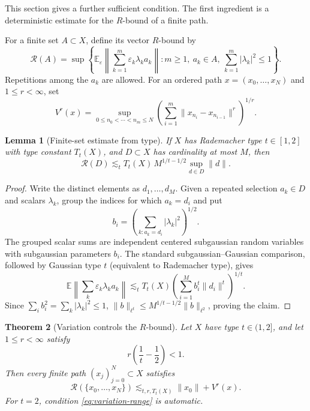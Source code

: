 \documentclass[11pt]{article}
\newtheorem{theorem}{Theorem}[section]
\newtheorem{lemma}[theorem]{Lemma}
\theoremstyle{definition}
\newcommand{\E}{\mathbb E}
\newcommand{\cR}{\mathcal R}
\newcommand{\1}{\mathbf 1}
\newcommand{\eps}{\varepsilon}
\begin{document}
This section gives a further sufficient condition.  The first ingredient is a
deterministic estimate for the $R$-bound of a finite path.

For a finite set $A\subset X$, define its vector $R$-bound by
\[
 \cR(A)=\sup\left\{
 \E_\eps\left\|\sum_{k=1}^m\eps_k\lambda_ka_k\right\|:
 m\ge1,\ a_k\in A,\ \sum_{k=1}^m|\lambda_k|^2\le1
 \right\}.
\]
Repetitions among the $a_k$ are allowed.  For an ordered path
$x=(x_0,\ldots,x_N)$ and $1\le r<\infty$, set
\[
 V^r(x)=\sup_{0\le n_0<\cdots<n_m\le N}
 \left(\sum_{i=1}^m\|x_{n_i}-x_{n_{i-1}}\|^r\right)^{1/r}.
\]

\begin{lemma}[Finite-set estimate from type]\label{lem:finite-set-type}
If $X$ has Rademacher type $t\in[1,2]$ with type constant $T_t(X)$, and
$D\subset X$ has cardinality at most $M$, then
\[
 \cR(D)\lesssim_t T_t(X)\,M^{1/t-1/2}\sup_{d\in D}\|d\|.
\]
\end{lemma}

\begin{proof}
Write the distinct elements as $d_1,\ldots,d_M$.  Given a repeated selection
$a_k\in D$ and scalars $\lambda_k$, group the indices for which $a_k=d_i$ and
put
\[
 b_i=\left(\sum_{k:a_k=d_i}|\lambda_k|^2\right)^{1/2}.
\]
The grouped scalar sums are independent centered subgaussian random variables
with subgaussian parameters $b_i$.  The standard subgaussian--Gaussian
comparison, followed by Gaussian type $t$ (equivalent to Rademacher type), gives
\[
 \E\left\|\sum_k\eps_k\lambda_ka_k\right\|
 \lesssim_t T_t(X)
 \left(\sum_{i=1}^M b_i^t\|d_i\|^t\right)^{1/t}.
\]
Since $\sum_i b_i^2=\sum_k|\lambda_k|^2\le1$,
$\|b\|_{\ell^t}\le M^{1/t-1/2}\|b\|_{\ell^2}$, proving the claim.
\end{proof}

\begin{theorem}[Variation controls the $R$-bound]\label{thm:variation-rbound}
Let $X$ have type $t\in(1,2]$, and let $1\le r<\infty$ satisfy
\begin{equation}\label{eq:variation-range}
 r\left(\frac1t-\frac12\right)<1.
\end{equation}
Then every finite path $(x_j)_{j=0}^N\subset X$ satisfies
\begin{equation}\label{eq:variation-rbound}
 \cR(\{x_0,\ldots,x_N\})
 \lesssim_{t,r,T_t(X)} \|x_0\|+V^r(x).
\end{equation}
For $t=2$, condition \eqref{eq:variation-range} is automatic.
\end{theorem}
\end{document}
